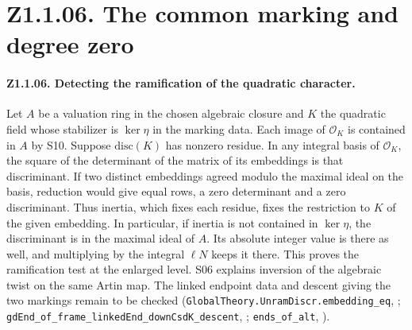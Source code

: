 \section*{Z1.1.06. The common marking and degree zero}

\paragraph{Z1.1.06. Detecting the ramification of the quadratic character.}
\label{r8:small:Z1.1.06}
Let \(A\) be a valuation ring in the chosen algebraic closure and \(K\) the
quadratic field whose stabilizer is \(\ker\eta\) in the marking data.
Each image of \(\mathcal O_K\) is contained in \(A\) by S10.
Suppose \(\mathrm{disc}(K)\) has nonzero residue. In any integral basis
of \(\mathcal O_K\), the square of the determinant of the matrix of its
embeddings is that discriminant. If two distinct embeddings agreed modulo
the maximal ideal on the basis, reduction would give equal rows, a zero
determinant and a zero discriminant. Thus inertia, which fixes each
residue, fixes the restriction to \(K\) of the given embedding. In
particular, if inertia is not contained in \(\ker\eta\), the discriminant
is in the maximal ideal of \(A\). Its absolute integer value is there
as well, and multiplying by the integral \(\ell N\) keeps it there.
This proves the ramification test at the enlarged level. S06 explains
inversion of the algebraic twist on the same Artin map. The linked
endpoint data and descent giving the two markings remain to be checked
(\nolinkurl{GlobalTheory.UnramDiscr.embedding_eq},
;
\nolinkurl{gdEnd_of_frame_linkedEnd_downCsdK_descent},
;
\nolinkurl{ends_of_alt}, ).


